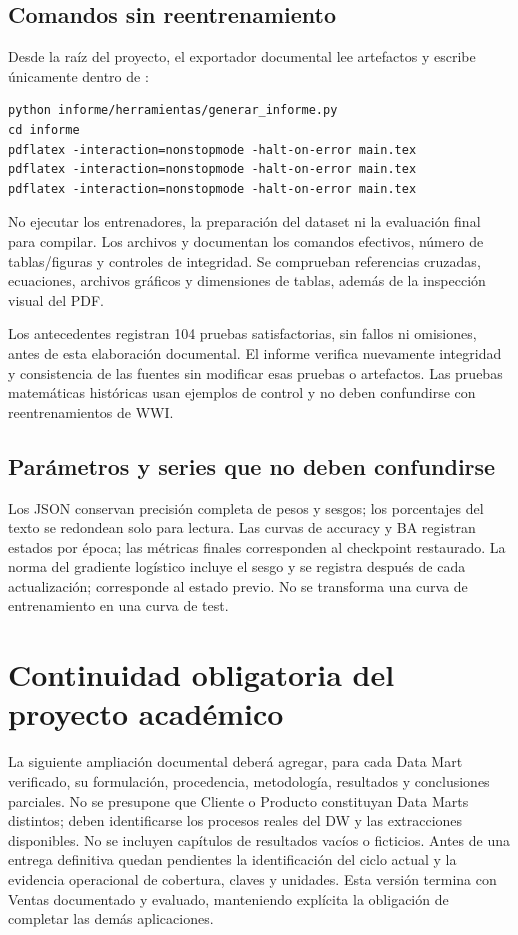 \subsection{Comandos sin reentrenamiento}
Desde la raíz del proyecto, el exportador documental lee artefactos y escribe únicamente dentro de :
\begin{verbatim}
python informe/herramientas/generar_informe.py
cd informe
pdflatex -interaction=nonstopmode -halt-on-error main.tex
pdflatex -interaction=nonstopmode -halt-on-error main.tex
pdflatex -interaction=nonstopmode -halt-on-error main.tex
\end{verbatim}
No ejecutar los entrenadores, la preparación del dataset ni la evaluación final para compilar. Los archivos  y  documentan los comandos efectivos, número de tablas/figuras y controles de integridad. Se comprueban referencias cruzadas, ecuaciones, archivos gráficos y dimensiones de tablas, además de la inspección visual del PDF.

Los antecedentes registran 104 pruebas satisfactorias, sin fallos ni omisiones, antes de esta elaboración documental. El informe verifica nuevamente integridad y consistencia de las fuentes sin modificar esas pruebas o artefactos. Las pruebas matemáticas históricas usan ejemplos de control y no deben confundirse con reentrenamientos de WWI.

\subsection{Parámetros y series que no deben confundirse}
Los JSON conservan precisión completa de pesos y sesgos; los porcentajes del texto se redondean solo para lectura. Las curvas de accuracy y BA registran estados por época; las métricas finales corresponden al checkpoint restaurado. La norma del gradiente logístico incluye el sesgo y se registra después de cada actualización;  corresponde al estado previo. No se transforma una curva de entrenamiento en una curva de test.

\section{Continuidad obligatoria del proyecto académico}
La siguiente ampliación documental deberá agregar, para cada Data Mart verificado, su formulación, procedencia, metodología, resultados y conclusiones parciales. No se presupone que Cliente o Producto constituyan Data Marts distintos; deben identificarse los procesos reales del DW y las extracciones disponibles. No se incluyen capítulos de resultados vacíos o ficticios. Antes de una entrega definitiva quedan pendientes la identificación del ciclo actual y la evidencia operacional de cobertura, claves y unidades. Esta versión termina con Ventas documentado y evaluado, manteniendo explícita la obligación de completar las demás aplicaciones.
